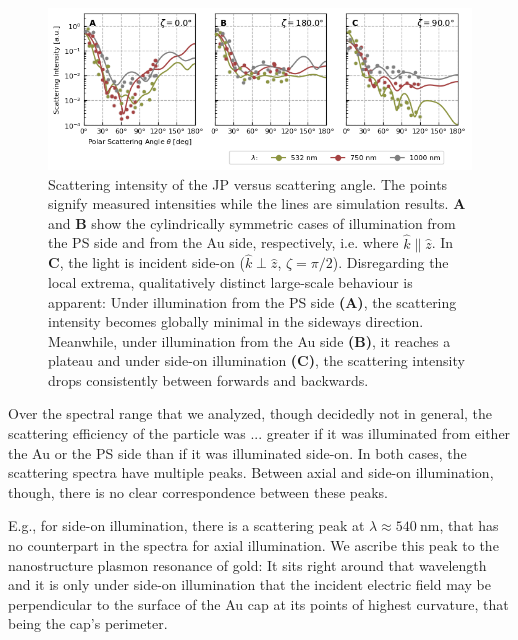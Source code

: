 \documentclass[10pt]{article}
\begin{document}
\begin{multicols}{2}
\begin{figure}[t!]
    \centering
    \includegraphics[width=\textwidth]{[fig] cartesian mieplots (3, placeholder)}
    \caption{Scattering intensity of the JP versus scattering angle. 
    The points signify measured intensities while the lines are simulation results.  
    {\sffamily\bfseries A} and {\sffamily\bfseries B} show the cylindrically symmetric cases of illumination from the PS side and from the Au side, respectively, i.e. where $\hat{k}\parallel\hat{z}$. 
    In {\sffamily\bfseries C}, the light is incident side-on ($\hat{k}\perp\hat{z}$, $\zeta=\pi/2$). 
    Disregarding the local extrema, qualitatively distinct large-scale behaviour is apparent: Under illumination from the PS side {\sffamily\bfseries (A)}, the scattering intensity becomes globally minimal in the sideways direction. 
    Meanwhile, under illumination from the Au side {\sffamily\bfseries (B)}, it reaches a plateau and under side-on illumination {\sffamily\bfseries (C)}, the scattering intensity drops consistently between forwards and backwards.  
    }
    \label{fig:jp-mieplots-oneline}
\end{figure}





Over the spectral range that we analyzed, though decidedly not in general, the scattering efficiency of the particle was ... greater if it was illuminated from either the Au or the PS side than if it was illuminated side-on. 
In both cases, the scattering spectra have multiple peaks. 
Between axial and side-on illumination, though, there is no clear correspondence between these peaks. 

E.g., for side-on illumination, there is a scattering peak at $\lambda\approx\SI{540}{\nano\meter}$, that has no counterpart in the spectra for axial illumination. 
We ascribe this peak to the nanostructure plasmon resonance of gold: 
It sits right around that wavelength and it is only under side-on illumination that the incident electric field may be perpendicular to the surface of the Au cap at its points of highest curvature, that being the cap's perimeter. 


\end{multicols}
\end{document}
